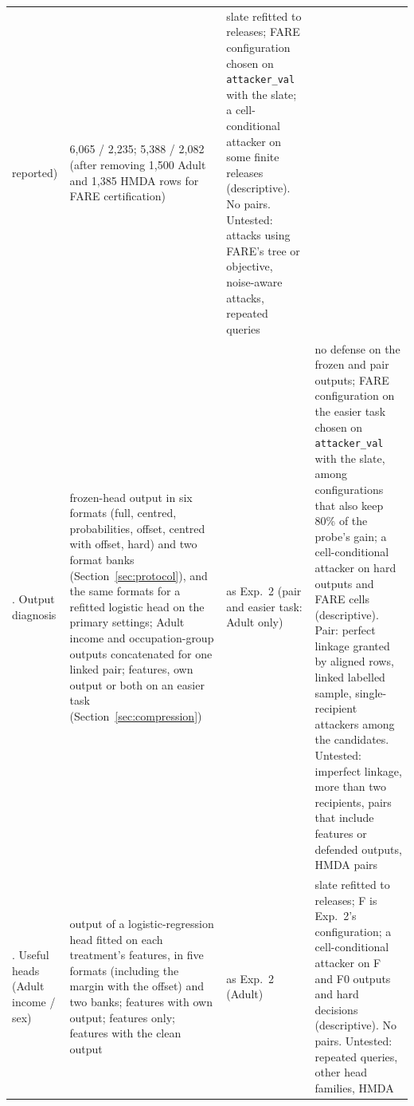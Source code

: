 \documentclass[10pt]{article}
\begin{document}
\begin{table}[!tbp]
\begin{tabular}{@{}L{2.2cm}L{4.6cm}L{2.5cm}L{5.6cm}@{}}
reported) & 6{,}065 / 2{,}235;
5{,}388 / 2{,}082 (after removing 1{,}500 Adult and 1{,}385 HMDA rows for FARE certification) & slate refitted to releases; FARE configuration
chosen on \texttt{attacker\_val} with the slate; a cell-conditional attacker on some finite releases (descriptive). No
pairs. Untested: attacks using FARE's tree or objective, noise-aware attacks, repeated queries\\
. Output diagnosis & frozen-head output in six formats (full, centred, probabilities, offset, centred with offset,
hard) and two format banks (Section~\ref{sec:protocol}), and the same formats for a refitted logistic head on the primary settings; Adult income and
occupation-group outputs concatenated for one linked pair; features, own output or both on an easier task (Section~\ref{sec:compression}) & as Exp.~2
(pair and easier task: Adult only) & no defense on the frozen and pair outputs; FARE configuration on the easier task
chosen on \texttt{attacker\_val} with the slate, among configurations that also keep 80\% of the probe's gain; a
cell-conditional attacker on hard outputs and FARE cells (descriptive). Pair: perfect linkage granted by
aligned rows, linked labelled sample, single-recipient attackers among the candidates. Untested: imperfect linkage, more
than two recipients, pairs that include features or defended outputs, HMDA pairs\\
. Useful heads (Adult income / sex) & output of a logistic-regression head fitted on each treatment's features, in five formats (including the margin with the offset) and two banks; features with own output; features only; features with the clean output & as
Exp.~2 (Adult) & slate refitted to releases; F is Exp.~2's configuration; a cell-conditional attacker on F and F0 outputs
and hard decisions (descriptive). No pairs. Untested: repeated queries, other head families, HMDA\\
\bottomrule
\end{tabular}
\end{table}
\end{document}
